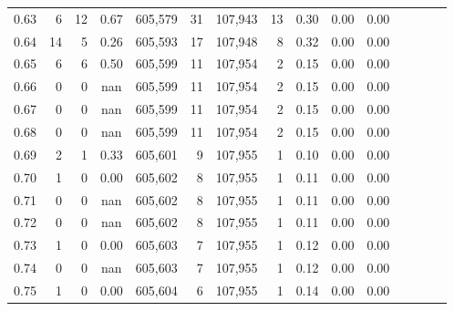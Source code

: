 \begin{tabular}{rrrcrrrrrrrrrrr}
0.63 &        6 &      12 &                                       0.67 &  605,579 &       31 &  107,943 &       13 &  0.30 &  0.00 &                         0.00 \\
0.64 &       14 &       5 &                                       0.26 &  605,593 &       17 &  107,948 &        8 &  0.32 &  0.00 &                         0.00 \\
0.65 &        6 &       6 &                                       0.50 &  605,599 &       11 &  107,954 &        2 &  0.15 &  0.00 &                         0.00 \\
0.66 &        0 &       0 &                                        nan &  605,599 &       11 &  107,954 &        2 &  0.15 &  0.00 &                         0.00 \\
0.67 &        0 &       0 &                                        nan &  605,599 &       11 &  107,954 &        2 &  0.15 &  0.00 &                         0.00 \\
0.68 &        0 &       0 &                                        nan &  605,599 &       11 &  107,954 &        2 &  0.15 &  0.00 &                         0.00 \\
0.69 &        2 &       1 &                                       0.33 &  605,601 &        9 &  107,955 &        1 &  0.10 &  0.00 &                         0.00 \\
0.70 &        1 &       0 &                                       0.00 &  605,602 &        8 &  107,955 &        1 &  0.11 &  0.00 &                         0.00 \\
0.71 &        0 &       0 &                                        nan &  605,602 &        8 &  107,955 &        1 &  0.11 &  0.00 &                         0.00 \\
0.72 &        0 &       0 &                                        nan &  605,602 &        8 &  107,955 &        1 &  0.11 &  0.00 &                         0.00 \\
0.73 &        1 &       0 &                                       0.00 &  605,603 &        7 &  107,955 &        1 &  0.12 &  0.00 &                         0.00 \\
0.74 &        0 &       0 &                                        nan &  605,603 &        7 &  107,955 &        1 &  0.12 &  0.00 &                         0.00 \\
0.75 &        1 &       0 &                                       0.00 &  605,604 &        6 &  107,955 &        1 &  0.14 &  0.00 &                         0.00 \\

\end{tabular}
